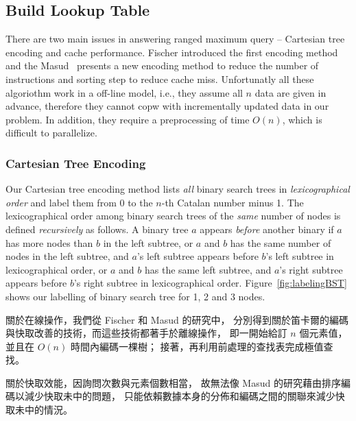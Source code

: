 %

\subsection{Build Lookup Table}

There are two main issues in answering ranged maximum query --
Cartesian tree encoding and cache performance.  Fischer introduced the
first encoding method and the Masud~\cite{Hasan2010CacheOA} presents a
new encoding method to reduce the number of instructions and sorting
step to reduce cache miss.  Unfortunatly all these algoriothm work in
a off-line model, i.e., they assume all $n$ data are given in advance,
therefore they cannot copw with incrementally updated data in our
problem.  In addition, they require a preprocessing of time $O(n)$,
which is difficult to parallelize.


\subsubsection{Cartesian Tree Encoding}

Our Cartesian tree encoding method lists {\em all} binary search trees
in {\em lexicographical order} and label them from $0$ to the $n$-th
Catalan number minus 1.  The lexicographical order among binary search
trees of the {\em same} number of nodes is defined {\em recursively}
as follows.  A binary tree $a$ appears {\em before} another binary if
$a$ has more nodes than $b$ in the left subtree, or $a$ and $b$ has
the same number of nodes in the left subtree, and $a$'s left subtree
appears before $b$'s left subtree in lexicographical order, or $a$ and
$b$ has the same left subtree, and $a$'s right subtree appears before
$b$'s right subtree in lexicographical order.
Figure~\ref{fig:labelingBST} shows our labelling of binary search tree
for 1, 2 and 3 nodes.

\iffalse
關於在線操作，我們從 Fischer \cite{fischer} 和 Masud \cite{masud} 的研究中，
分別得到關於笛卡爾的編碼與快取改善的技術，而這些技術都著手於離線操作，
即一開始給訂 $n$ 個元素值，並且在 $O(n)$ 時間內編碼一棵樹；
接著，再利用前處理的查找表完成極值查找。

關於快取效能，因詢問次數與元素個數相當，
故無法像 Masud \cite{masud} 的研究藉由排序編碼以減少快取未中的問題，
只能依賴數據本身的分佈和編碼之間的關聯來減少快取未中的情況。

